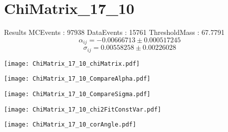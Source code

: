 \documentclass[a4paper,12pt]{article}
\begin{document}
\section{ChiMatrix\_17\_10}
\begin{minipage}{0.49\linewidth} Results \newline
MCEvents : 97938\newline
DataEvents : 15761 \newline
ThresholdMass : 67.7791\\
$$\alpha_{ij} = -0.00666713\pm 0.000517245$$
$$\sigma_{ij} = 0.00558258\pm 0.00226028$$
\end{minipage}\hfill
\begin{minipage}{0.49\linewidth} 
\texttt{[image: ChiMatrix\_17\_10\_chiMatrix.pdf]}\\
\end{minipage}
\hfill
\begin{minipage}{0.49\linewidth} 
\texttt{[image: ChiMatrix\_17\_10\_CompareAlpha.pdf]}\\
\end{minipage}
\hfill
\begin{minipage}{0.49\linewidth} 
\texttt{[image: ChiMatrix\_17\_10\_CompareSigma.pdf]}\\
\end{minipage}
\begin{minipage}{0.49\linewidth} 
\texttt{[image: ChiMatrix\_17\_10\_chi2FitConstVar.pdf]}\\
\end{minipage}
\hfill
\begin{minipage}{0.49\linewidth} 
\texttt{[image: ChiMatrix\_17\_10\_corAngle.pdf]}\\
\end{minipage}
\end{document}
